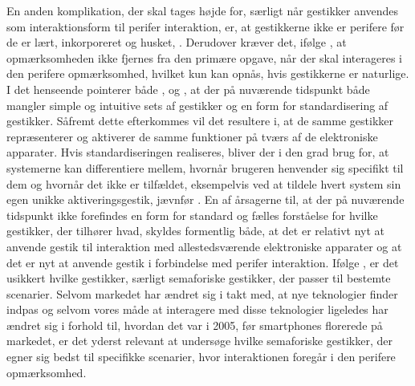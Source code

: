 En anden komplikation, der skal tages højde for, særligt når gestikker anvendes som interaktionsform til perifer interaktion, er, at gestikkerne ikke er perifere før de er lært, inkorporeret og husket, \parencite[s. 16]{PDF:PIEmbeddingHCIOnTheRelevance}. Derudover kræver det, ifølge \textcite[s. 16]{PDF:PIEmbeddingHCIOnTheRelevance}, at opmærksomheden ikke fjernes fra den primære opgave, når der skal interageres i den perifere opmærksomhed, hvilket kun kan opnås, hvis gestikkerne er naturlige. I det henseende pointerer både \textcite[s. 8]{PDF:NaturalUserInterfaces}, \textcite[s. 26]{PDF:ATaxonomyOfGestures} og \textcite[s. 19]{PDF:PIEmbeddingHCIOnTheRelevance}, at der på nuværende tidspunkt både mangler simple og intuitive sets af gestikker og en form for standardisering af gestikker. Såfremt dette efterkommes vil det resultere i, at de samme gestikker repræsenterer og aktiverer de samme funktioner på tværs af de elektroniske apparater. Hvis standardiseringen realiseres, bliver der i den grad brug for, at systemerne kan differentiere mellem, hvornår brugeren henvender sig specifikt til dem og hvornår det ikke er tilfældet, eksempelvis ved at tildele hvert system sin egen unikke aktiveringsgestik, jævnfør . En af årsagerne til, at der på nuværende tidspunkt ikke forefindes en form for standard og fælles forståelse for hvilke gestikker, der tilhører hvad, skyldes formentlig både, at det er relativt nyt at anvende gestik til interaktion med allestedsværende elektroniske apparater og at det er nyt at anvende gestik i forbindelse med perifer interaktion. Ifølge \textcite[s. 28]{PDF:ATaxonomyOfGestures}, er det usikkert hvilke gestikker, særligt semaforiske gestikker, der passer til bestemte scenarier. Selvom markedet har ændret sig i takt med, at nye teknologier finder indpas og selvom vores måde at interagere med disse teknologier ligeledes har ændret sig i forhold til, hvordan det var i 2005, før smartphones florerede på markedet, er det yderst relevant at undersøge hvilke semaforiske gestikker, der egner sig bedst til specifikke scenarier, hvor interaktionen foregår i den perifere opmærksomhed.

